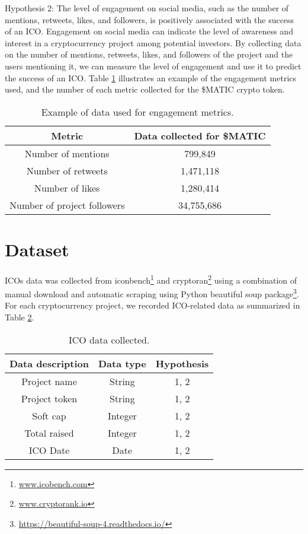 \documentclass[runningheads]{llncs}
\begin{document}
Hypothesis 2: The level of engagement on social media, such as the number of mentions, retweets, likes, and followers, is positively associated with the success of an ICO. Engagement on social media can indicate the level of awareness and interest in a cryptocurrency project among potential investors. By collecting data on the number of mentions, retweets, likes, and followers of the project and the users mentioning it, we can measure the level of engagement and use it to predict the success of an ICO. Table \ref{tab2} illustrates an example of the engagement metrics used, and the number of each metric collected for the \$MATIC crypto token.

\begin{table}[htbp]
\caption{Example of data used for engagement metrics.}
\begin{center}
\begin{tabular}{|c|c|}
\hline
\textbf{Metric} & \textbf{Data collected for \$MATIC} \\
\hline
Number of mentions & 799,849 \\
\hline
Number of retweets & 1,471,118 \\
\hline
Number of likes & 1,280,414 \\
\hline
Number of project followers & 34,755,686 \\
\hline
\end{tabular}
\label{tab2}
\end{center}
\end{table}

\section{Dataset}

ICOs data was collected from iconbench\footnote{\url{www.icobench.com}} and cryptoran\footnote{\url{www.cryptorank.io}} using a combination of manual download and automatic scraping using Python beautiful soup package\footnote{\url{https://beautiful-soup-4.readthedocs.io/}}. For each cryptocurrency project, we recorded ICO-related data as summarized in Table \ref{tab3}.

\begin{table}[htbp]
\caption{ICO data collected.}
\begin{center}
\begin{tabular}{|c|c|c|}
\hline
\textbf{Data description} & \textbf{Data type} & \textbf{Hypothesis} \\
\hline
Project name & String & 1, 2 \\
\hline
Project token & String & 1, 2 \\
\hline
Soft cap & Integer & 1, 2 \\
\hline
Total raised & Integer & 1, 2 \\
\hline
ICO Date & Date & 1, 2 \\
\hline
\end{tabular}
\label{tab3}
\end{center}
\end{table}
\end{document}

